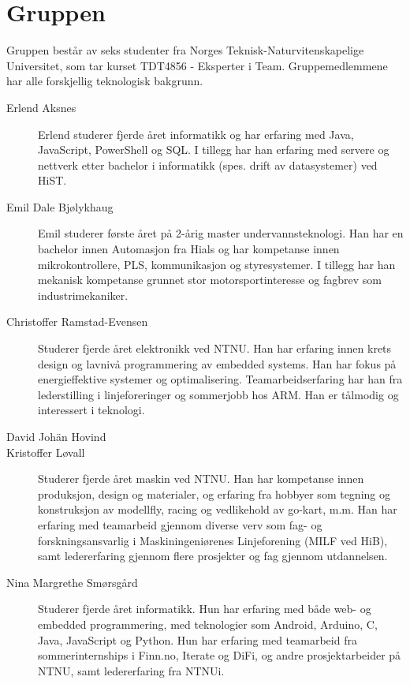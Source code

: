 \section{Gruppen}
Gruppen består av seks studenter fra Norges Teknisk-Naturvitenskapelige
Universitet, som tar kurset TDT4856 - Eksperter i Team. Gruppemedlemmene
har alle forskjellig teknologisk bakgrunn.
\begin{description} %

	\item[Erlend Aksnes] Erlend studerer fjerde året informatikk og har erfaring med Java, JavaScript, PowerShell og SQL. I tillegg har han erfaring med servere og nettverk etter bachelor i informatikk (spes. drift av datasystemer) ved HiST. 

	\item[Emil Dale Bjølykhaug] Emil studerer første året på 2-årig master undervannsteknologi. 
Han har en bachelor innen Automasjon fra Hials og har kompetanse innen mikrokontrollere, PLS, 
kommunikasjon og styresystemer. I tillegg har han mekanisk kompetanse grunnet stor 
motorsportinteresse og fagbrev som industrimekaniker.


	\item[Christoffer Ramstad-Evensen] \comment{\hfill \\} Studerer fjerde
  året elektronikk ved NTNU. Han har erfaring innen krets design
  og lavnivå programmering av embedded systems. Han har fokus på energieffektive
  systemer og optimalisering. Teamarbeidserfaring har han fra lederstilling i
  linjeforeringer og sommerjobb hos ARM. Han er tålmodig og interessert i
  teknologi.
	\item[David Johän Hovind] %
	\item[Kristoffer Løvall] \comment{\hfill \\} Studerer fjerde året maskin ved NTNU. 
	Han har kompetanse innen produksjon, design og materialer, og erfaring
	fra hobbyer som tegning og konstruksjon av modellfly, racing og vedlikehold
	av go-kart, m.m. Han har erfaring med teamarbeid gjennom diverse verv som fag-
	og forskningsansvarlig i Maskiningeniørenes Linjeforening (MILF ved HiB), samt
	ledererfaring gjennom flere prosjekter og fag gjennom utdannelsen.
	
	\item[Nina Margrethe Smørsgård] \comment{\hfill \\}Studerer fjerde året
	informatikk. Hun har erfaring med både web- og embedded programmering, med
	teknologier som Android, Arduino, C, Java, JavaScript og Python. Hun har
	erfaring med teamarbeid fra sommerinternships i Finn.no, Iterate og DiFi,
	og andre prosjektarbeider på NTNU, samt ledererfaring fra NTNUi.
\end{description}